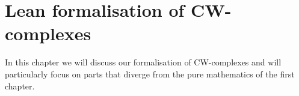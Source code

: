 \chapter{Lean formalisation of CW-complexes}

In this chapter we will discuss our formalisation of CW-complexes and will particularly focus on parts that diverge from the pure mathematics of the first chapter. 



